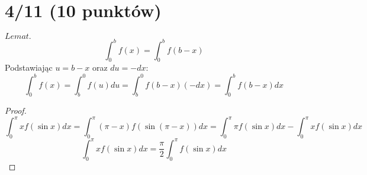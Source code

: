 \documentclass{article}
\title{}
\date{24.03.2020}
\author{Maurycy Borkowski}
\begin{document}
\maketitle

\section{4/11 (10 punktów)}
$Lemat.$
$$
\int_0^b f(x) = \int_0^b f(b-x)
$$
Podstawiając $u = b - x$ oraz $du = -dx$:
$$
\int_0^b f(x) = \int_b^0 f(u)du = \int_b^0 f(b-x)(-dx) = \int_0^b f(b-x)dx 
$$
\begin{proof}
$$
\int_0^\pi xf(\sin x)dx = \int_0^\pi (\pi-x)f(\sin{(\pi-x)})dx = \int_0^\pi \pi f(\sin x)dx - \int_0^\pi xf(\sin x)dx
$$
$$
\int_0^\pi xf(\sin x)dx = \frac{\pi}{2}\int_0^\pi f(\sin x)dx
$$
\end{proof}
\end{document}
